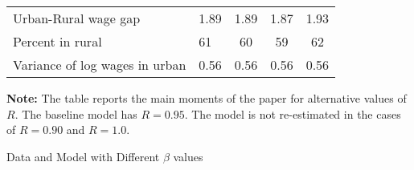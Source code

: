 \documentclass[12pt,pdftex]{article}
\renewcommand{\arraystretch}{1.1}
\begin{document}
\begin{onehalfspacing}
\begin{table}[!htb]
\begin{center}
\begin{tabular}{l l c c c}
\hline
Urban-Rural wage gap                                                & 1.89              & 1.89              & 1.87              & 1.93  \\
Percent in rural                                                    & \phantom{0.}61    & \phantom{0.}60    & \phantom{0.}59    &  \phantom{0.} 62 \\
Variance of log wages in urban                                      & 0.56              & 0.56              &  0.56             &      0.56      \\
\hline
\end{tabular}
\parbox[c]{6.5in}{%
{\footnotesize  \vspace{0.3cm} \textbf{Note:} The table reports the main moments of the paper for alternative values of $R$.
 The baseline model has $R=0.95$. The model is not re-estimated in the cases of $R=0.90$ and $R=1.0$.}
}
\end{center}
\end{table}


\begin{table}[!htb]
\small
\setlength {\tabcolsep}{2mm}
\renewcommand{\arraystretch}{1.2}
\begin{center}
\caption{Data and Model with Different $\beta$ values \label{ta:alt_beta}}


\end{center}
\end{table}
\end{onehalfspacing}
\end{document}

